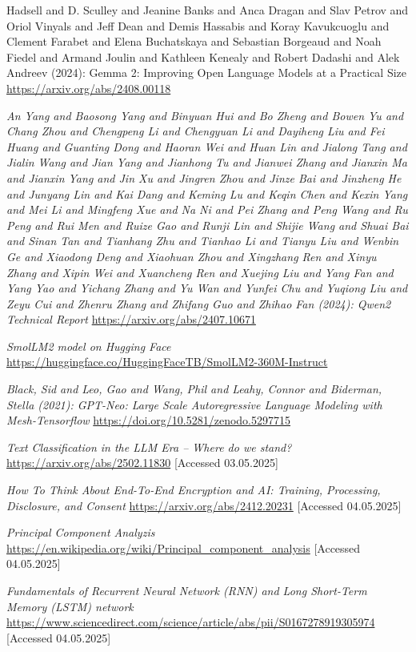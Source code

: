 \documentclass[licencjacka,en]{pracamgr}
\begin{document}
\begin{thebibliography}{99}
{Hadsell and D. Sculley and Jeanine Banks and Anca Dragan and Slav Petrov and Oriol Vinyals and Jeff Dean and Demis Hassabis and Koray Kavukcuoglu and Clement Farabet and Elena Buchatskaya and Sebastian Borgeaud and Noah Fiedel and Armand Joulin and Kathleen Kenealy and Robert Dadashi and Alek Andreev (2024): Gemma 2: Improving Open Language Models at a Practical Size
}
\url{https://arxiv.org/abs/2408.00118}

\textit{An Yang and Baosong Yang and Binyuan Hui and Bo Zheng and Bowen Yu and Chang Zhou and Chengpeng Li and Chengyuan Li and Dayiheng Liu and Fei Huang and Guanting Dong and Haoran Wei and Huan Lin and Jialong Tang and Jialin Wang and Jian Yang and Jianhong Tu and Jianwei Zhang and Jianxin Ma and Jianxin Yang and Jin Xu and Jingren Zhou and Jinze Bai and Jinzheng He and Junyang Lin and Kai Dang and Keming Lu and Keqin Chen and Kexin Yang and Mei Li and Mingfeng Xue and Na Ni and Pei Zhang and Peng Wang and Ru Peng and Rui Men and Ruize Gao and Runji Lin and Shijie Wang and Shuai Bai and Sinan Tan and Tianhang Zhu and Tianhao Li and Tianyu Liu and Wenbin Ge and Xiaodong Deng and Xiaohuan Zhou and Xingzhang Ren and Xinyu Zhang and Xipin Wei and Xuancheng Ren and Xuejing Liu and Yang Fan and Yang Yao and Yichang Zhang and Yu Wan and Yunfei Chu and Yuqiong Liu and Zeyu Cui and Zhenru Zhang and Zhifang Guo and Zhihao Fan (2024): Qwen2 Technical Report}
\url{https://arxiv.org/abs/2407.10671}

\textit{SmolLM2 model on Hugging Face}
\url{https://huggingface.co/HuggingFaceTB/SmolLM2-360M-Instruct}

\textit{Black, Sid and Leo, Gao and Wang, Phil and Leahy, Connor and Biderman, Stella (2021): GPT-Neo: Large Scale Autoregressive Language Modeling with Mesh-Tensorflow}
\url{https://doi.org/10.5281/zenodo.5297715}

\textit{Text Classification in the LLM Era -- Where do we stand?}
\url{https://arxiv.org/abs/2502.11830}
[Accessed 03.05.2025]

\textit{How To Think About End-To-End Encryption and AI: Training, Processing, Disclosure, and Consent}
\url{https://arxiv.org/abs/2412.20231}
[Accessed 04.05.2025]

\textit{Principal Component Analyzis}
\url{https://en.wikipedia.org/wiki/Principal_component_analysis}
[Accessed 04.05.2025]

\textit{Fundamentals of Recurrent Neural Network (RNN) and Long Short-Term Memory (LSTM) network}
\url{https://www.sciencedirect.com/science/article/abs/pii/S0167278919305974}
[Accessed 04.05.2025]


\end{thebibliography}
\end{document}
